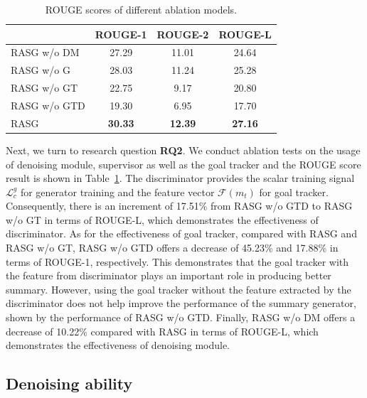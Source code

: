 \documentclass[letterpaper]{article} %
\begin{document}
\begin{table}[t]
\centering
\small
\caption{ROUGE scores of different ablation models.}
\begin{tabular}{@{}lcc c@{}}
\toprule
& ROUGE-1 & ROUGE-2 & ROUGE-L \\
\midrule
RASG w/o DM & 27.29 & 11.01 & 24.64 \\
RASG w/o G & 28.03 & 11.24 & 25.28 \\
RASG w/o GT & 22.75 & 9.17 & 20.80 \\
RASG w/o GTD & 19.30 & 6.95 & 17.70 \\
RASG & \textbf{30.33} & \textbf{12.39} & \textbf{27.16} \\
\bottomrule
\end{tabular}
\label{tab:comp_rouge_ablation}
\end{table}
Next, we turn to research question \textbf{RQ2}.
We conduct ablation tests on the usage of denoising module, supervisor as well as the goal tracker and the ROUGE score result is shown in Table~\ref{tab:comp_rouge_ablation}.
The discriminator provides the scalar training signal $\mathcal{L}_c^g$ for generator training and the feature vector $\mathcal{F}(m_t)$ for goal tracker.
Consequently, there is an increment of 17.51\% from RASG w/o GTD to RASG w/o GT in terms of ROUGE-L, which demonstrates the effectiveness of discriminator.
As for the effectiveness of goal tracker, compared with RASG and RASG w/o GT, RASG w/o GTD offers a decrease of 45.23\% and 17.88\% in terms of ROUGE-1, respectively. This demonstrates that the goal tracker with the feature from discriminator plays an important role in producing better summary.
However, using the goal tracker without the feature extracted by the discriminator does not help improve the performance of the summary generator, shown by the performance of RASG w/o GTD.
Finally, RASG w/o DM offers a decrease of 10.22\% compared with RASG in terms of ROUGE-L, which demonstrates the effectiveness of denoising module.

\subsection{Denoising ability}
\end{document}
